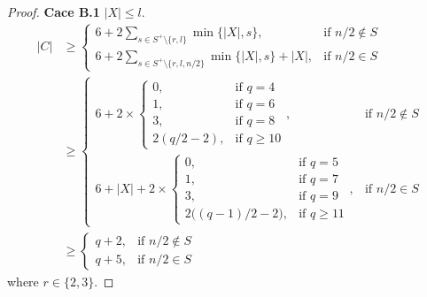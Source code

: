\documentclass{article}
\begin{document}
\begin{proof}
{\bf Cace B.1}  $|X|\le l$.
\begin{align}
|C| &\geq 
\begin{cases}
\displaystyle 6 + 2\sum_{s\in S^+\setminus\{r,l\}} \min\{|X|,s\}, & \text{if } n/2\notin S \\[4pt]
\displaystyle 6 + 2\sum_{s\in S^+\setminus\{r,l,n/2\}} \min\{|X|,s\}+ |X|, & \text{if } n/2\in S
\end{cases} \\
&\geq 
\begin{cases}
\displaystyle 6 + 2\times
\begin{cases}
0, & \text{if } q=4 \\
1, & \text{if } q=6 \\
3, & \text{if } q=8 \\
2(q/2-2), & \text{if } q\ge 10
\end{cases}, & \text{if } n/2\notin S \\[4pt]
\displaystyle 6+ |X| + 2\times
\begin{cases}
0, & \text{if } q=5 \\
1, & \text{if } q=7 \\
3, & \text{if } q=9 \\
2\big((q-1)/2-2\big), & \text{if } q\ge 11
\end{cases}, & \text{if } n/2\in S
\end{cases} \\
&\geq 
\begin{cases}
\displaystyle q+2, & \text{if } n/2\notin S \\[4pt]
\displaystyle q+5, & \text{if } n/2\in S
\end{cases}
\end{align}
where $r\in\{2,3\}$.


\end{proof}
\end{document}
